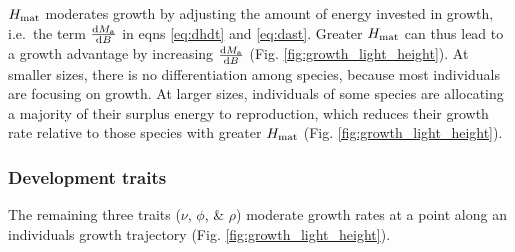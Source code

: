 \documentclass[a4paper,11pt]{article}
\begin{document}
$H_{{\rm mat}}$ moderates growth by adjusting the amount of energy invested in growth, i.e.~the term $\frac{{\rm d}M_{\rm a}}{{\rm d}B}$ in eqns \ref{eq:dhdt} and \ref{eq:dast}. Greater $H_{{\rm mat}}$ can thus lead to a growth advantage by increasing $\frac{{\rm d}M_{\rm a}}{{\rm d}B}$ (Fig. \ref{fig:growth_light_height}). At smaller sizes, there is no differentiation among species, because most individuals are focusing on growth. At larger sizes, individuals of some species are allocating a majority of their surplus energy to reproduction, which reduces their growth rate relative to those species with greater $H_{{\rm mat}}$ (Fig. \ref{fig:growth_light_height}).

\subsubsection{Development traits}

The remaining three traits ($\nu$, $\phi$, \& $\rho$) moderate growth rates at a point along an individuals growth trajectory (Fig. \ref{fig:growth_light_height}).

\end{document}
